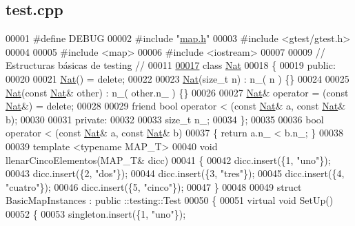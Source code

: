 \hypertarget{test_8cpp_source}{}\subsection{test.\+cpp}

\begin{DoxyCode}
00001 \textcolor{preprocessor}{#define DEBUG}
00002 \textcolor{preprocessor}{#include "\hyperlink{map_8h}{map.h}"}
00003 \textcolor{preprocessor}{#include <gtest/gtest.h>}
00004 
00005 \textcolor{preprocessor}{#include <map>}
00006 \textcolor{preprocessor}{#include <iostream>}
00007 
00009 \textcolor{comment}{// Estructuras básicas de testing //}
00011 \textcolor{comment}{}
\hypertarget{test_8cpp_source.tex_l00017}{}\hyperlink{classNat}{00017} \textcolor{keyword}{class }\hyperlink{classNat}{Nat}
00018 \{
00019     \textcolor{keyword}{public}:
00020 
00021         \hyperlink{classNat}{Nat}() = \textcolor{keyword}{delete};
00022 
00023         \hyperlink{classNat}{Nat}(\textcolor{keywordtype}{size\_t} n) : n\_( n ) \{\}
00024 
00025         \hyperlink{classNat}{Nat}(\textcolor{keyword}{const} \hyperlink{classNat}{Nat}& other) : n\_( other.n\_ ) \{\}
00026 
00027         \hyperlink{classNat}{Nat}& operator = (\textcolor{keyword}{const} \hyperlink{classNat}{Nat}&) = \textcolor{keyword}{delete};
00028 
00029         \textcolor{keyword}{friend} \textcolor{keywordtype}{bool} operator < (\textcolor{keyword}{const} \hyperlink{classNat}{Nat}& a, \textcolor{keyword}{const} \hyperlink{classNat}{Nat}& b);
00030 
00031     \textcolor{keyword}{private}:
00032 
00033         \textcolor{keywordtype}{size\_t} n\_;
00034 \};
00035 
00036 \textcolor{keywordtype}{bool} operator < (\textcolor{keyword}{const} \hyperlink{classNat}{Nat}& a, \textcolor{keyword}{const} \hyperlink{classNat}{Nat}& b)
00037 \{ \textcolor{keywordflow}{return} a.n\_ < b.n\_; \}
00038 
00039 \textcolor{keyword}{template} <\textcolor{keyword}{typename} MAP\_T>
00040 \textcolor{keywordtype}{void} llenarCincoElementos(MAP\_T& dicc)
00041 \{
00042     dicc.insert(\{1, \textcolor{stringliteral}{"uno"}\});
00043     dicc.insert(\{2, \textcolor{stringliteral}{"dos"}\});
00044     dicc.insert(\{3, \textcolor{stringliteral}{"tres"}\});
00045     dicc.insert(\{4, \textcolor{stringliteral}{"cuatro"}\});
00046     dicc.insert(\{5, \textcolor{stringliteral}{"cinco"}\});
00047 \}
00048 
00049 \textcolor{keyword}{struct }BasicMapInstances : \textcolor{keyword}{public} ::testing::Test
00050 \{
00051     \textcolor{keyword}{virtual} \textcolor{keywordtype}{void} SetUp()
00052     \{
00053         singleton.insert(\{1, \textcolor{stringliteral}{"uno"}\});

\end{DoxyCode}
